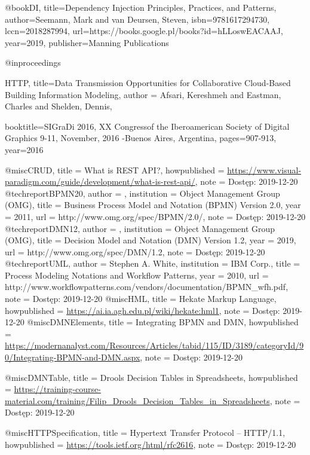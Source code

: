 @book{DI,
  title={Dependency Injection Principles, Practices, and Patterns},
  author={Seemann, Mark and van Deursen, Steven},
  isbn={9781617294730},
  lccn={2018287994},
  url={https://books.google.pl/books?id=hLLoswEACAAJ},
  year={2019},
  publisher={Manning Publications}
}


@inproceedings{HTTP,
  title={Data Transmission Opportunities for Collaborative Cloud-Based Building
Information Modeling},
	author = {Afsari, Kereshmeh and Eastman, Charles and Shelden, Dennis},

  booktitle={SIGraDi 2016, XX Congressof the Iberoamerican Society of Digital Graphics 9-11, November, 2016 -Buenos Aires, Argentina},
  pages={907-913},
  year={2016}
}


@misc{CRUD,
  title = {What is REST API?},
  howpublished = {\url{https://www.visual-paradigm.com/guide/development/what-is-rest-api/}},
  note = {Dostęp: 2019-12-20}
}
@techreport{BPMN20,
	author = {},
	institution = {Object Management Group (OMG)},
	title = {{Business Process Model and Notation (BPMN) Version 2.0}},
	year = {2011},
	url = {http://www.omg.org/spec/BPMN/2.0/},
	note = {Dostęp: 2019-12-20}
}
@techreport{DMN12,
	author = {},
	institution = {Object Management Group (OMG)},
	title = {{Decision Model and Notation (DMN) Version 1.2}},
	year = {2019},
	url = {http://www.omg.org/spec/DMN/1.2},
	note = {Dostęp: 2019-12-20}
}
@techreport{UML,
	author = {Stephen A. White},
	institution = {IBM Corp.},
	title = {{Process Modeling Notations and
Workflow Patterns}},
	year = {2010},
	url = {http://www.workflowpatterns.com/vendors/documentation/BPMN_wfh.pdf},
	note = {Dostęp: 2019-12-20}
}
@misc{HML,
  title = {Hekate Markup Language},
  howpublished = {\url{https://ai.ia.agh.edu.pl/wiki/hekate:hml1}},
  note = {Dostęp: 2019-12-20}
}
@misc{DMNElements,
  title = {Integrating BPMN and DMN},
  howpublished = {\url{https://modernanalyst.com/Resources/Articles/tabid/115/ID/3189/categoryId/90/Integrating-BPMN-and-DMN.aspx}},
  note = {Dostęp: 2019-12-20}
}

@misc{DMNTable,
  title = {Drools Decision Tables in Spreadsheets},
  howpublished = {\url{https://training-course-material.com/training/Filip_Drools_Decision_Tables_in_Spreadsheets}},
  note = {Dostęp: 2019-12-20}
}

@misc{HTTPSpecification,
  title = {Hypertext Transfer Protocol -- HTTP/1.1},
  howpublished = {\url{https://tools.ietf.org/html/rfc2616}},
  note = {Dostęp: 2019-12-20}
}

